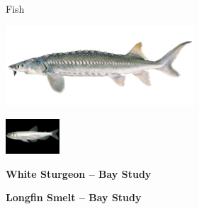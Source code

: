 \documentclass[]{article}\usepackage[]{graphicx}\usepackage[]{color}
\begin{document}
\begin{Row}
  \begin{Cell}{1}
    \begin{center}
      {\Huge Fish}
    \end{center}
  \end{Cell}
\end{Row}

\begin{Row}
  \begin{Cell}{1}
    \begin{center}
      \includegraphics[width=7cm,align=m]{figures/otherfish/white_sturgeon_fig.png}
    \end{center}
  \end{Cell}
  \begin{Cell}{1}
    \begin{center}
      \includegraphics[align=m]{figures/smelt/photo_longfin_smelt.png}
    \end{center}
  \end{Cell}
\end{Row}

\begin{Row}
  \begin{Cell}{1}
    \begin{center}
      {\bf {\large White Sturgeon – Bay Study}}
    \end{center}
  \end{Cell}
  \begin{Cell}{1}
    \begin{center}
      {\bf {\large Longfin Smelt – Bay Study}}
    \end{center}
  \end{Cell}
\end{Row}
\end{document}
